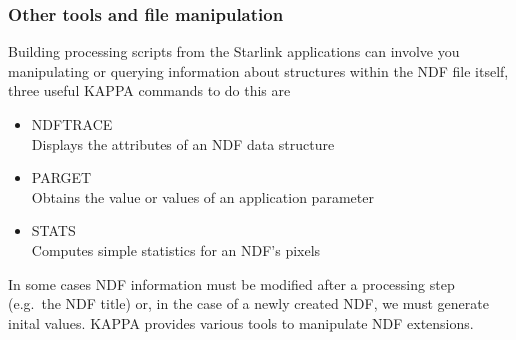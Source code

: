 \documentclass[twoside,11pt]{article}
\newcommand{\htmlref}[2]{#1}
\newcommand{\xref}[3]{#1}
\begin{document}
\subsubsection{Other tools and file manipulation}

Building processing scripts from the Starlink applications can involve you manipulating or querying information about structures within the NDF file itself, three useful KAPPA commands to do this are

\begin{itemize}
\item{\xref{NDFTRACE}{sun95}{NDFTRACE}}\\
Displays the attributes of an NDF data structure 
\item{\xref{PARGET}{sun95}{PARGET}}\\
Obtains the value or values of an application parameter 
\item{\xref{STATS}{sun95}{STATS}}\\
Computes simple statistics for an NDF's pixels  
\end{itemize}  

In some cases NDF information must be modified after a processing step (e.g.\ the NDF title) or, in the case of a \htmlref{newly created}{sc16_newndf} NDF, we must generate inital values. KAPPA provides various tools to manipulate NDF extensions.
\end{document}
